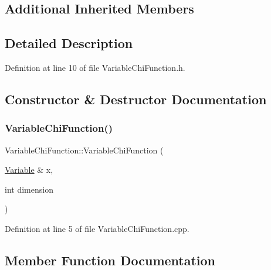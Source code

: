 \subsection*{Additional Inherited Members}


\subsection{Detailed Description}


Definition at line 10 of file Variable\+Chi\+Function.\+h.



\subsection{Constructor \& Destructor Documentation}
\hypertarget{classocra_1_1VariableChiFunction_ac83eecf18f118396efdb5513923eeba6}{}\label{classocra_1_1VariableChiFunction_ac83eecf18f118396efdb5513923eeba6} 
\subsubsection{\texorpdfstring{Variable\+Chi\+Function()}{VariableChiFunction()}}
{\footnotesize\ttfamily Variable\+Chi\+Function\+::\+Variable\+Chi\+Function (\begin{DoxyParamCaption}\item[{\hyperlink{classocra_1_1Variable}{Variable} \&}]{x,  }\item[{int}]{dimension }\end{DoxyParamCaption})}



Definition at line 5 of file Variable\+Chi\+Function.\+cpp.



\subsection{Member Function Documentation}
\hypertarget{classocra_1_1VariableChiFunction_ad58b8fbb68e8cb27aab585f40875918f}{}\label{classocra_1_1VariableChiFunction_ad58b8fbb68e8cb27aab585f40875918f} 
